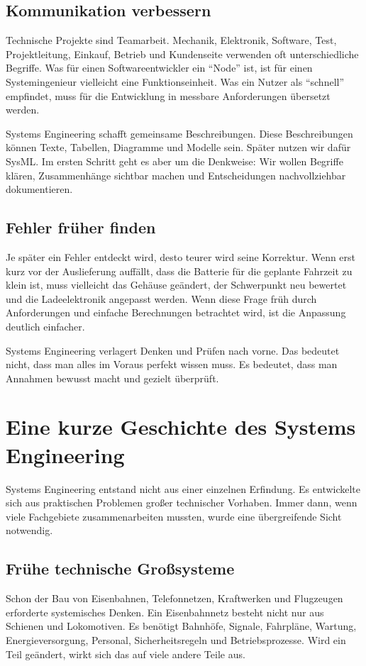 \subsection{Kommunikation verbessern}
Technische Projekte sind Teamarbeit. Mechanik, Elektronik, Software, Test, Projektleitung, Einkauf, Betrieb und Kundenseite verwenden oft unterschiedliche Begriffe. Was für einen Softwareentwickler ein \enquote{Node} ist, ist für einen Systemingenieur vielleicht eine Funktionseinheit. Was ein Nutzer als \enquote{schnell} empfindet, muss für die Entwicklung in messbare Anforderungen übersetzt werden.

Systems Engineering schafft gemeinsame Beschreibungen. Diese Beschreibungen können Texte, Tabellen, Diagramme und Modelle sein. Später nutzen wir dafür SysML. Im ersten Schritt geht es aber um die Denkweise: Wir wollen Begriffe klären, Zusammenhänge sichtbar machen und Entscheidungen nachvollziehbar dokumentieren.

\subsection{Fehler früher finden}
Je später ein Fehler entdeckt wird, desto teurer wird seine Korrektur. Wenn erst kurz vor der Auslieferung auffällt, dass die Batterie für die geplante Fahrzeit zu klein ist, muss vielleicht das Gehäuse geändert, der Schwerpunkt neu bewertet und die Ladeelektronik angepasst werden. Wenn diese Frage früh durch Anforderungen und einfache Berechnungen betrachtet wird, ist die Anpassung deutlich einfacher.

Systems Engineering verlagert Denken und Prüfen nach vorne. Das bedeutet nicht, dass man alles im Voraus perfekt wissen muss. Es bedeutet, dass man Annahmen bewusst macht und gezielt überprüft.

\section{Eine kurze Geschichte des Systems Engineering}
Systems Engineering entstand nicht aus einer einzelnen Erfindung. Es entwickelte sich aus praktischen Problemen großer technischer Vorhaben. Immer dann, wenn viele Fachgebiete zusammenarbeiten mussten, wurde eine übergreifende Sicht notwendig.

\subsection{Frühe technische Großsysteme}
Schon der Bau von Eisenbahnen, Telefonnetzen, Kraftwerken und Flugzeugen erforderte systemisches Denken. Ein Eisenbahnnetz besteht nicht nur aus Schienen und Lokomotiven. Es benötigt Bahnhöfe, Signale, Fahrpläne, Wartung, Energieversorgung, Personal, Sicherheitsregeln und Betriebsprozesse. Wird ein Teil geändert, wirkt sich das auf viele andere Teile aus.

